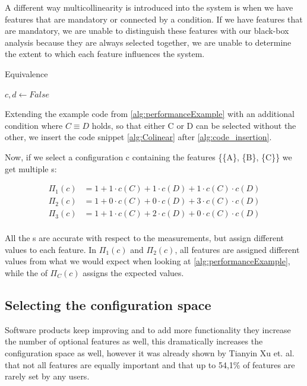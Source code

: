 A different way multicollinearity is introduced into the system is when we have features that are mandatory or connected by a condition. 
If we have features that are mandatory, we are unable to distinguish these features with our black-box analysis because they are always selected
together, we are unable to determine the extent to which each feature influences the system. \cite{Multicollinearity}

\begin{algorithm}[h]
    \caption{Equivalence \label{alg:Colinear}}
    \begin{algorithmic}[1]

        \State $c,d \gets False$
    \EndIf

    \end{algorithmic}
    \end{algorithm}

Extending the example code from \ref{alg:performanceExample} with an additional condition where $C \equiv D$ holds, so that 
either C or D can be selected without the other, we insert the code snippet \ref{alg:Colinear} after \ref{alg:code_insertion}.

Now, if we select a configuration c containing the features \{\{A\}, \{B\}, \{C\}\} we get multiple {\perfInfluenceModel}s:

\begin{align*}
    \Pi_1(c) &= 1 + 1\cdot c(C) + 1 \cdot c(D) + 1\cdot c(C) \cdot c(D) \\
    \Pi_2(c) &= 1 + 0\cdot c(C) + 0 \cdot c(D) + 3\cdot c(C) \cdot c(D) \\
    \Pi_3(c) &= 1 + 1\cdot c(C) + 2 \cdot c(D) + 0\cdot c(C) \cdot c(D) \\
\end{align*}

All the {\perfInfluenceModel}s are accurate with respect to the measurements, but assign different values to each feature. 
In $\Pi_1(c)$ and $\Pi_2(c)$, all features are assigned different values from what we would expect when looking at \ref{alg:performanceExample},
while the \perfInfluenceModel of $\Pi_C(c)$ assigns the expected values.

\subsection{Selecting the configuration space}
Software products keep improving and to add more functionality they increase the number of optional features as well, this dramatically increases 
the configuration space as well, however it was already shown by Tianyin Xu et. al. \cite{TooManyKnobs} that not all features are equally important and that up to
54,1\% of features are rarely set by any users.


